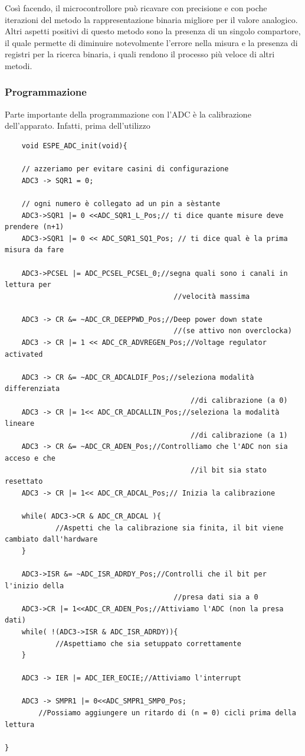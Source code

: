 Così facendo, il microcontrollore può ricavare con precisione e con poche iterazioni del metodo la rappresentazione binaria migliore per il valore analogico.\\

Altri aspetti positivi di questo metodo sono la presenza di un singolo compartore, il quale permette di diminuire notevolmente l'errore nella misura e la presenza di registri per la ricerca binaria, i quali rendono il processo più veloce di altri metodi.\\

\subsubsection{Programmazione}
Parte importante della programmazione con l'ADC è la calibrazione dell'apparato. Infatti, prima dell'utilizzo

\noindent
\begin{verbatim}
    void ESPE_ADC_init(void){

	// azzeriamo per evitare casini di configurazione
	ADC3 -> SQR1 = 0;

	// ogni numero è collegato ad un pin a sèstante
	ADC3->SQR1 |= 0 <<ADC_SQR1_L_Pos;// ti dice quante misure deve prendere (n+1)
	ADC3->SQR1 |= 0 << ADC_SQR1_SQ1_Pos; // ti dice qual è la prima misura da fare

	ADC3->PCSEL |= ADC_PCSEL_PCSEL_0;//segna quali sono i canali in lettura per
                                        //velocità massima

	ADC3 -> CR &= ~ADC_CR_DEEPPWD_Pos;//Deep power down state
                                        //(se attivo non overclocka)
	ADC3 -> CR |= 1 << ADC_CR_ADVREGEN_Pos;//Voltage regulator activated

	ADC3 -> CR &= ~ADC_CR_ADCALDIF_Pos;//seleziona modalità differenziata
                                            //di calibrazione (a 0)
	ADC3 -> CR |= 1<< ADC_CR_ADCALLIN_Pos;//seleziona la modalità lineare
                                            //di calibrazione (a 1)
	ADC3 -> CR &= ~ADC_CR_ADEN_Pos;//Controlliamo che l'ADC non sia acceso e che
                                            //il bit sia stato resettato
	ADC3 -> CR |= 1<< ADC_CR_ADCAL_Pos;// Inizia la calibrazione

	while( ADC3->CR & ADC_CR_ADCAL ){							
            //Aspetti che la calibrazione sia finita, il bit viene cambiato dall'hardware
	}

	ADC3->ISR &= ~ADC_ISR_ADRDY_Pos;//Controlli che il bit per l'inizio della
                                        //presa dati sia a 0
	ADC3->CR |= 1<<ADC_CR_ADEN_Pos;//Attiviamo l'ADC (non la presa dati)
	while( !(ADC3->ISR & ADC_ISR_ADRDY)){						
            //Aspettiamo che sia setuppato correttamente
	}

	ADC3 -> IER |= ADC_IER_EOCIE;//Attiviamo l'interrupt

	ADC3 -> SMPR1 |= 0<<ADC_SMPR1_SMP0_Pos;
        //Possiamo aggiungere un ritardo di (n = 0) cicli prima della lettura

}
\end{verbatim}
\label{code:ADC_init}

